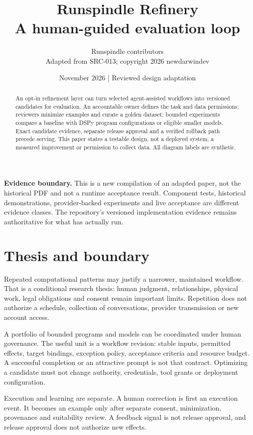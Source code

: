 \documentclass[11pt]{article}
\title{Runspindle Refinery\\\large A human-guided evaluation loop}
\author{Runspindle contributors\\\small Adapted from SRC-013; copyright 2026 newdarwindev}
\date{November 2026 | Reviewed design adaptation}
\begin{document}
\maketitle
\begin{abstract}
An opt-in refinement layer can turn selected agent-assisted workflows into versioned candidates for evaluation. An accountable owner defines the task and data permissions; reviewers minimize examples and curate a golden dataset; bounded experiments compare a baseline with DSPy program configurations or eligible smaller models. Exact candidate evidence, separate release approval and a verified rollback path precede serving. This paper states a testable design, not a deployed system, a measured improvement or permission to collect data. All diagram labels are synthetic.
\end{abstract}
\textbf{Evidence boundary.} This is a new compilation of an adapted paper, not the historical PDF and not a runtime acceptance result. Component tests, historical demonstrations, provider-backed experiments and live acceptance are different evidence classes. The repository's versioned implementation evidence remains authoritative for what has actually run.
\section{Thesis and boundary}
Repeated computational patterns may justify a narrower, maintained workflow. That is a conditional research thesis: human judgment, relationships, physical work, legal obligations and consent remain important limits. Repetition does not authorize a schedule, collection of conversations, provider transmission or new account access.

A portfolio of bounded programs and models can be coordinated under human governance. The useful unit is a workflow revision: stable inputs, permitted effects, target bindings, exception policy, acceptance criteria and resource budget. A successful completion or an attractive prompt is not that contract. Optimizing a candidate must not change authority, credentials, tool grants or deployment configuration.

Execution and learning are separate. A human correction is first an execution event. It becomes an example only after separate consent, minimization, provenance and suitability review. A feedback signal is not release approval, and release approval does not authorize new effects.
\clearpage
\end{document}
